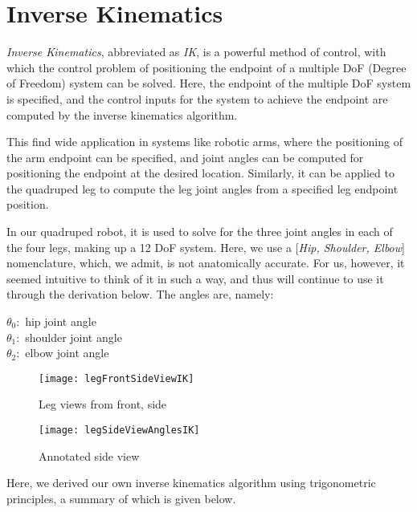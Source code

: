 \section{Inverse Kinematics}

\emph{Inverse Kinematics}, abbreviated as \emph{IK}, is a powerful method of control, with which the control problem of positioning the endpoint of a multiple DoF (Degree of Freedom) system can be solved. Here, the endpoint of the multiple DoF system is specified, and the control inputs for the system to achieve the endpoint are computed by the inverse kinematics algorithm.

This find wide application in systems like robotic arms, where the positioning of the arm endpoint can be specified, and joint angles can be computed for positioning the endpoint at the desired location. Similarly, it can be applied to the quadruped leg to compute the leg joint angles from a specified leg endpoint position.

In our quadruped robot, it is used to solve for the three joint angles in each of the four legs, making up a 12 DoF system. Here, we use a [\emph{Hip, Shoulder, Elbow}] nomenclature, which, we admit, is not anatomically accurate. For us, however, it seemed intuitive to think of it in such a way, and thus will continue to use it through the derivation below. The angles are, namely:

\begin{center}
    \(\theta_0 : \) hip joint angle\\
    \(\theta_1 : \) shoulder joint angle\\
    \(\theta_2 : \) elbow joint angle\\
\end{center}

\begin{figure}
    \centering
    \begin{multicols}{2}
        \texttt{[image: legFrontSideViewIK]}
        \caption{Leg views from front, side}
        \label{fig:legViewsIK}
        
        \texttt{[image: legSideViewAnglesIK]}
        \caption{Annotated side view}
        \label{fig:sideViewAnnIK}
    \end{multicols}     
\end{figure}

Here, we derived our own inverse kinematics algorithm using trigonometric principles, a summary of which is given below.

